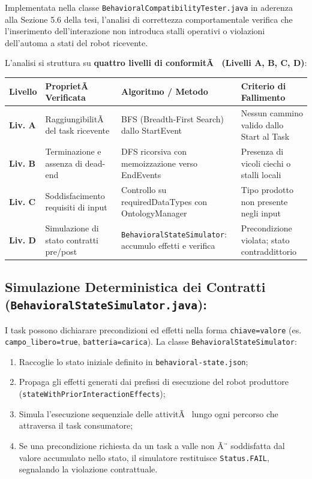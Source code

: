 ﻿\documentclass[11pt, a4paper]{report}
\begin{document}
Implementata nella classe \texttt{BehavioralCompatibilityTester.java} in aderenza alla Sezione 5.6 della tesi, l'analisi di correttezza comportamentale verifica che l'inserimento dell'interazione non introduca stalli operativi o violazioni dell'automa a stati del robot ricevente.

L'analisi si struttura su \textbf{quattro livelli di conformitÃ  (Livelli A, B, C, D)}:

\begin{table}[h!]
\centering
\small
\renewcommand{\arraystretch}{1.3}
\begin{tabularx}{\textwidth}{>{\bfseries}l X X X}
\toprule
\rowcolor{lightBg}
Livello & ProprietÃ  Verificata & Algoritmo / Metodo & Criterio di Fallimento \\
\midrule
Liv. A & RaggiungibilitÃ  del task ricevente & BFS (Breadth-First Search) dallo StartEvent & Nessun cammino valido dallo Start al Task \\
\hline
Liv. B & Terminazione e assenza di dead-end & DFS ricorsiva con memoizzazione verso EndEvents & Presenza di vicoli ciechi o stalli locali \\
\hline
Liv. C & Soddisfacimento requisiti di input & Controllo su requiredDataTypes con OntologyManager & Tipo prodotto non presente negli input \\
\hline
Liv. D & Simulazione di stato contratti pre/post & \texttt{BehavioralStateSimulator}: accumulo effetti e verifica & Precondizione violata; stato contraddittorio \\
\bottomrule
\end{tabularx}
\end{table}

\subsection{Simulazione Deterministica dei Contratti (\texttt{BehavioralStateSimulator.java}):}
I task possono dichiarare precondizioni ed effetti nella forma \texttt{chiave=valore} (es. \texttt{campo\_libero=true}, \texttt{batteria=carica}).
La classe \texttt{BehavioralStateSimulator}:
\begin{enumerate}
    \item Raccoglie lo stato iniziale definito in \texttt{behavioral-state.json};
    \item Propaga gli effetti generati dai prefissi di esecuzione del robot produttore (\texttt{stateWithPriorInteractionEffects});
    \item Simula l'esecuzione sequenziale delle attivitÃ  lungo ogni percorso che attraversa il task consumatore;
    \item Se una precondizione richiesta da un task a valle non Ã¨ soddisfatta dal valore accumulato nello stato, il simulatore restituisce \texttt{Status.FAIL}, segnalando la violazione contrattuale.
\end{enumerate}
\end{document}
